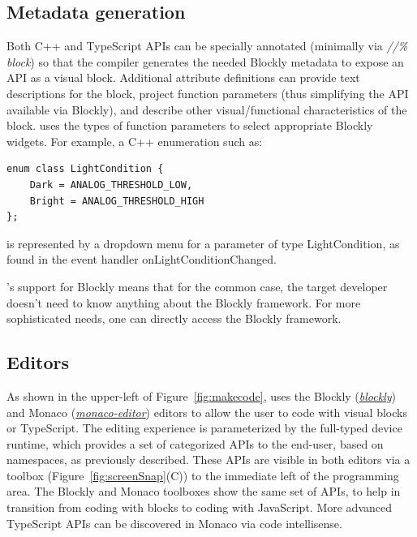 \subsection{Metadata generation}

Both C++ and TypeScript APIs can be specially annotated (minimally via 
\emph{//\% block}) so that the \MC compiler generates the needed
Blockly metadata to expose an API as a visual block.
Additional attribute definitions can provide text descriptions for the block, project function
parameters (thus simplifying the API available via Blockly), and describe other visual/functional
characteristics of the block.  \MC uses the types of function parameters to select appropriate
Blockly widgets.  For example, a C++ enumeration such as:
\begin{lstlisting}
enum class LightCondition {
    Dark = ANALOG_THRESHOLD_LOW,
    Bright = ANALOG_THRESHOLD_HIGH
};
\end{lstlisting}
is represented by a dropdown menu for a parameter of type LightCondition, as found in
the event handler onLightConditionChanged.
 
\MCN's support for Blockly means that for the common case, the target developer doesn't need
to know anything about the Blockly framework.
For more sophisticated needs, one can directly access the Blockly framework. 

\subsection{Editors}

As shown in the upper-left of Figure~\ref{fig:makecode},
\MC uses the Blockly (\emph{\href{https://github.com/google/blockly}{blockly}}) and Monaco 
(\emph{\href{https://github.com/Microsoft/monaco-editor}{monaco-editor}}) editors to allow the user to code with
visual blocks or TypeScript. The editing experience is parameterized by the full-typed device
runtime, which provides a set of categorized APIs to the end-user, based on namespaces, as
previously described. These APIs are visible in both editors via a toolbox (Figure~\ref{fig:screenSnap}(C))
to the immediate
left of the programming area. The Blockly and Monaco toolboxes show the same set of APIs, to
help in transition from coding with blocks to coding with JavaScript. More advanced TypeScript
APIs can be discovered in Monaco via code intellisense.

